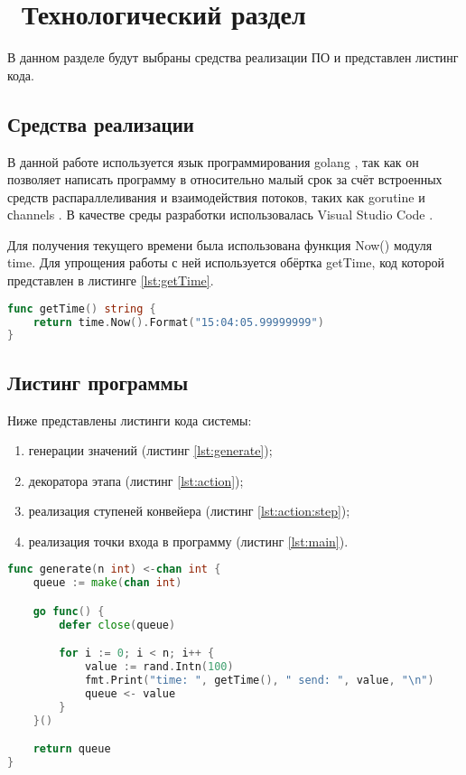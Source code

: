 \chapter{ Технологический раздел}
\label{cha:technological}

    В данном разделе будут выбраны средства реализации ПО и представлен листинг кода. 

    \section{Средства реализации}
        В данной работе используется язык программирования golang \cite{go}, так как
        он позволяет написать программу в относительно малый срок за счёт
        встроенных средств распараллеливания и взаимодействия потоков, таких как gorutine и сhannels \cite{go-concurrency}. 
        В качестве среды разработки использовалась Visual Studio Code \cite{visual-studio-code}.

        Для получения текущего времени была использована функция Now() модуля time. 
        Для упрощения работы с ней используется обёртка getTime, 
        код которой представлен в листинге \ref{lst:getTime}.

        \begin{lstlisting}[language=go, label=lst:getTime, caption=Функция получения текущего времени]
func getTime() string {
    return time.Now().Format("15:04:05.99999999")
}
        \end{lstlisting}

    \section{Листинг программы}
        Ниже представлены листинги кода системы:
        \begin{enumerate}
            \item генерации значений (листинг \ref{lst:generate});
            \item декоратора этапа (листинг \ref{lst:action});
            \item реализация ступеней конвейера (листинг \ref{lst:action:step});
            \item реализация точки входа в программу (листинг \ref{lst:main}).
        \end{enumerate}
        
        \begin{lstlisting}[language=go, label=lst:generate, caption=Реализация генерации значений]
func generate(n int) <-chan int {
    queue := make(chan int)

    go func() {
        defer close(queue)

        for i := 0; i < n; i++ {
            value := rand.Intn(100)
            fmt.Print("time: ", getTime(), " send: ", value, "\n")
            queue <- value
        }
    }()

    return queue
}
        \end{lstlisting}

